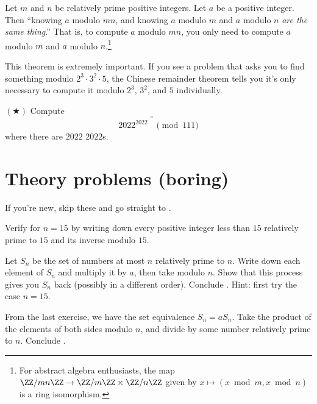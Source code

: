 \documentclass[11pt]{scrartcl}
\begin{document}
\begin{theorem}[Chinese remainder theorem] %
	Let $m$ and $n$ be relatively prime positive integers. Let $a$ be a positive integer. Then ``knowing $a$ modulo $mn$, and knowing $a$ modulo $m$ and $a$ modulo $n$ \emph{are the same thing}.'' That is, to compute $a$ modulo $mn$, you only need to compute $a$ modulo $m$ and $a$ modulo $n$.\footnote{For abstract algebra enthusiasts, the map $\ZZ/mn\ZZ \to \ZZ/m\ZZ \times \ZZ/n\ZZ$ given by $x \mapsto (x \bmod m,x\bmod n)$ is a ring isomorphism.}
\end{theorem}
This theorem is extremely important. If you see a problem that asks you to find something modulo $2^3 \cdot 3^2 \cdot 5$, the Chinese remainder theorem tells you it's only necessary to compute it modulo $2^3$, $3^2$, and $5$ individually.

\begin{example}[CMIMC 2023/A3] $(\bigstar)$
	\label{exe:cmimc-crt}
	Compute
	\[2022^{2022^{\cdot^{\cdot^{\cdot^{2022}}}}} \pmod{111}\]
	where there are $2022$ $2022$s. %
\end{example}


\section{Theory problems (boring)}\label{subsec:theory}

If you're new, skip these and go straight to .

\begin{exercise}
	Verify  for $n = 15$ by writing down every positive integer less than $15$ relatively prime to $15$ and its inverse modulo $15$.
\end{exercise}

\begin{exercise}
	Let $S_n$ be the set of numbers at most $n$ relatively prime to $n$. Write down each element of $S_n$ and multiply it by $a$, then take modulo $n$. Show that this process gives you $S_n$ back (possibly in a different order). Conclude . Hint: first try the case $n = 15$.
\end{exercise}

\begin{exercise}
	From the last exercise, we have the set equivalence $S_n = aS_n$. Take the product of the elements of both sides modulo $n$, and divide by some number relatively prime to $n$. Conclude .
\end{exercise}
\end{document}
